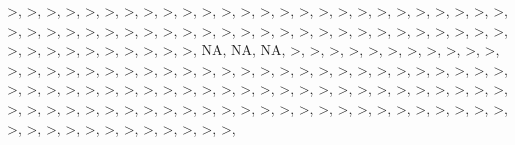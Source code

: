 \documentclass[12pt,]{article}
\begin{document}
\textgreater{}, \textgreater{}, \textgreater{}, \textgreater{},
\textgreater{}, \textgreater{}, \textgreater{}, \textgreater{},
\textgreater{}, \textgreater{}, \textgreater{}, \textgreater{},
\textgreater{}, \textgreater{}, \textgreater{}, \textgreater{},
\textgreater{}, \textgreater{}, \textgreater{}, \textgreater{},
\textgreater{}, \textgreater{}, \textgreater{}, \textgreater{},
\textgreater{}, \textgreater{}, \textgreater{}, \textgreater{},
\textgreater{}, \textgreater{}, \textgreater{}, \textgreater{},
\textgreater{}, \textgreater{}, \textgreater{}, \textgreater{},
\textgreater{}, \textgreater{}, \textgreater{}, \textgreater{},
\textgreater{}, \textgreater{}, \textgreater{}, \textgreater{},
\textgreater{}, \textgreater{}, \textgreater{}, \textgreater{},
\textgreater{}, \textgreater{}, \textgreater{}, \textgreater{},
\textgreater{}, \textgreater{}, \textgreater{}, \textgreater{},
\textgreater{}, \textgreater{}, \textgreater{}, \textgreater{},
\textgreater{}, \textgreater{}, NA, NA, NA, \textgreater{},
\textgreater{}, \textgreater{}, \textgreater{}, \textgreater{},
\textgreater{}, \textgreater{}, \textgreater{}, \textgreater{},
\textgreater{}, \textgreater{}, \textgreater{}, \textgreater{},
\textgreater{}, \textgreater{}, \textgreater{}, \textgreater{},
\textgreater{}, \textgreater{}, \textgreater{}, \textgreater{},
\textgreater{}, \textgreater{}, \textgreater{}, \textgreater{},
\textgreater{}, \textgreater{}, \textgreater{}, \textgreater{},
\textgreater{}, \textgreater{}, \textgreater{}, \textgreater{},
\textgreater{}, \textgreater{}, \textgreater{}, \textgreater{},
\textgreater{}, \textgreater{}, \textgreater{}, \textgreater{},
\textgreater{}, \textgreater{}, \textgreater{}, \textgreater{},
\textgreater{}, \textgreater{}, \textgreater{}, \textgreater{},
\textgreater{}, \textgreater{}, \textgreater{}, \textgreater{},
\textgreater{}, \textgreater{}, \textgreater{}, \textgreater{},
\textgreater{}, \textgreater{}, \textgreater{}, \textgreater{},
\textgreater{}, \textgreater{}, \textgreater{}, \textgreater{},
\textgreater{}, \textgreater{}, \textgreater{}, \textgreater{},
\textgreater{}, \textgreater{}, \textgreater{}, \textgreater{},
\textgreater{}, \textgreater{}, \textgreater{}, \textgreater{},
\textgreater{}, \textgreater{}, \textgreater{}, \textgreater{},
\textgreater{}, \textgreater{}, \textgreater{}, \textgreater{},
\textgreater{}, \textgreater{}, \textgreater{}, \textgreater{},
\textgreater{}, \textgreater{}, \textgreater{}, \textgreater{},
\textgreater{}, \textgreater{}, \textgreater{}, \textgreater{},
\textgreater{}, \textgreater{}, \textgreater{}, \textgreater{},
\end{document}
